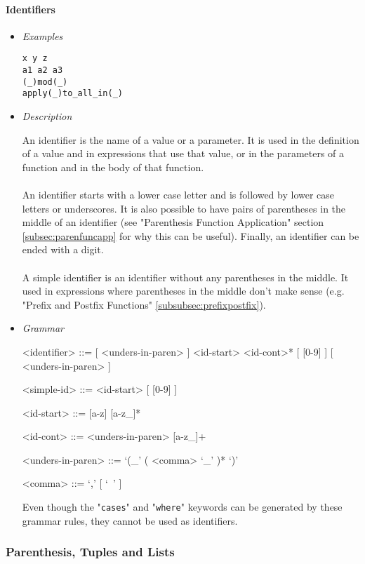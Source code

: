 \documentclass{article}
\begin{document}
\paragraph{Identifiers}
\begin{itemize}

\item \textit{Examples}
\begin{verbatim}
x y z
a1 a2 a3
(_)mod(_)
apply(_)to_all_in(_)
\end{verbatim}

\item \textit{Description}

An identifier is the name of a value or a parameter. It is used in the
definition of a value and in expressions that use that value, or in the
parameters of a function and in the body of that function.
\\\\
An identifier starts with a lower case letter and is followed by lower case
letters or underscores. It is also possible to have pairs of parentheses in the
middle of an identifier (see "Parenthesis Function Application" section
\ref{subsec:parenfuncapp} for why this can be useful).  Finally, an identifier
can be ended with a digit.
\\\\
A simple identifier is an identifier without any parentheses in the middle.
It used in expressions where parentheses in the middle don't make sense
(e.g. "Prefix and Postfix Functions" \ref{subsubsec:prefixpostfix}).

\item \textit{Grammar}
\begin{grammar}
<identifier> ::=
[ <unders-in-paren> ] <id-start> <id-cont>* [ [0-9] ] [ <unders-in-paren> ]

<simple-id> ::= <id-start> [ [0-9] ]

<id-start> ::= [a-z] [a-z_]*

<id-cont> ::= <unders-in-paren> [a-z_]+

<unders-in-paren> ::= `(_' ( <comma> `_' )* `)'

<comma> ::= `,' [ `\ ' ]
\end{grammar}
Even though the "\verb|cases|" and "\verb|where|" keywords can be generated
by these grammar rules, they cannot be used as identifiers.

\end{itemize}

\newpage
\subsubsection{Parenthesis, Tuples and Lists}
\end{document}
